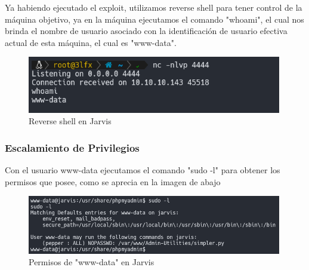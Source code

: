         \large{Ya habiendo ejecutado el exploit, utilizamos reverse shell para tener control de la máquina objetivo, ya en la máquina ejecutamos el comando "whoami", el cual nos brinda el nombre de usuario asociado con la identificación de usuario efectiva actual de esta máquina, el cual es "www-data".}
        \par
        \begin{figure}[H]
            \centering
            \includegraphics[width=0.99\textwidth]{imagenes/jarvis/12_reverse_shell_jarvis.png}
            \caption{Reverse shell en Jarvis}
        \end{figure}

    \subsubsection{Escalamiento de Privilegios}

        \large{Con el usuario www-data ejecutamos el comando "sudo -l" para obtener los permisos que posee, como se aprecia en la imagen de abajo}
        \par
        \begin{figure}[H]
            \centering
            \includegraphics[width=0.99\textwidth]{imagenes/jarvis/13_permiso_www_jarvis.png}
            \caption{Permisos de "www-data" en Jarvis}
        \end{figure}

